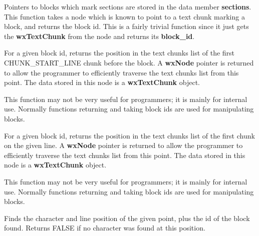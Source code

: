 

Pointers to blocks which mark sections are stored in the data member
{\bf sections}. This function takes a node which is known to point
to a text chunk marking a block, and returns the block id.
This is a fairly trivial function since it just gets the {\bf wxTextChunk}
from the node and returns its {\bf block\_id}.



For a given block id, returns the position in the text chunks list of
the first CHUNK\_START\_LINE chunk before the block.  A {\bf wxNode}
pointer is returned to allow the programmer to efficiently traverse
the text chunks list from this point. The data stored in this node is
a {\bf wxTextChunk} object.

This function may not be very useful for programmers; it is mainly for
internal use. Normally functions returning and taking block ids
are used for manipulating blocks.



For a given block id, returns the position in the text chunks list of
the first chunk on the given line.  A {\bf wxNode} pointer is returned
to allow the programmer to efficiently traverse the text chunks list
from this point. The data stored in this node is a {\bf wxTextChunk}
object.

This function may not be very useful for programmers; it is mainly for
internal use. Normally functions returning and taking block ids
are used for manipulating blocks.



Finds the character and line position of the given point, plus the id of the block found.
Returns FALSE if no character was found at this position.



